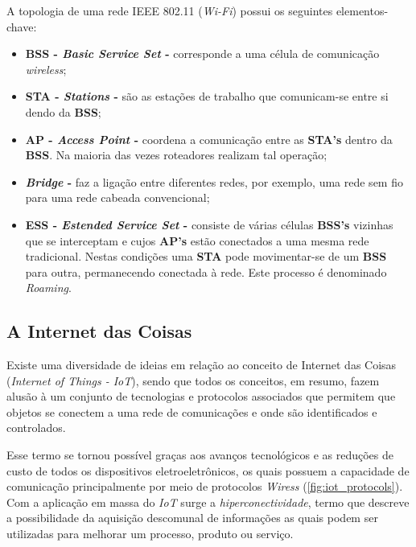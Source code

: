 A topologia de uma rede IEEE 802.11 (\textit{Wi-Fi})  possui os seguintes elementos-chave:

\begin{itemize}
	\item \textbf{BSS - \textit{Basic Service Set} -} corresponde a uma célula de comunicação \textit{wireless};
	\item \textbf{STA - \textit{Stations} -} são as estações de trabalho que comunicam-se entre si dendo da \textbf{BSS};
	\item \textbf{AP - \textit{Access Point} -} coordena a comunicação entre as \textbf{STA's} dentro da \textbf{BSS}. Na maioria das vezes roteadores realizam tal operação;
	\item \textbf{\textit{Bridge} -} faz a ligação entre diferentes redes, por exemplo, uma rede sem fio para uma rede cabeada convencional;
	\item  \textbf{ESS - \textit{Estended Service Set} -} consiste de várias células \textbf{BSS's} vizinhas que se interceptam e cujos \textbf{AP's} estão conectados a uma mesma rede tradicional. Nestas condições uma \textbf{STA} pode movimentar-se de um \textbf{BSS} para outra, permanecendo conectada à rede. Este processo é denominado \textit{Roaming}.
\end{itemize}

\subsection{A Internet das Coisas}

Existe uma diversidade de ideias em relação ao conceito de Internet das Coisas (\textit{Internet of Things - IoT}), sendo que todos os conceitos, em resumo, fazem alusão à um conjunto de tecnologias e protocolos associados que permitem que objetos se conectem a uma rede de comunicações e onde são identificados e controlados.

Esse termo se tornou possível graças aos avanços tecnológicos e as reduções de custo de todos os dispositivos eletroeletrônicos, os quais possuem a capacidade de comunicação principalmente por meio de protocolos \textit{Wiress} (\autoref{fig:iot_protocols}). Com a aplicação em massa do \textit{IoT} surge a \textit{hiperconectividade}, termo que descreve a possibilidade da aquisição descomunal de informações as quais podem ser utilizadas para melhorar um processo, produto ou serviço.

